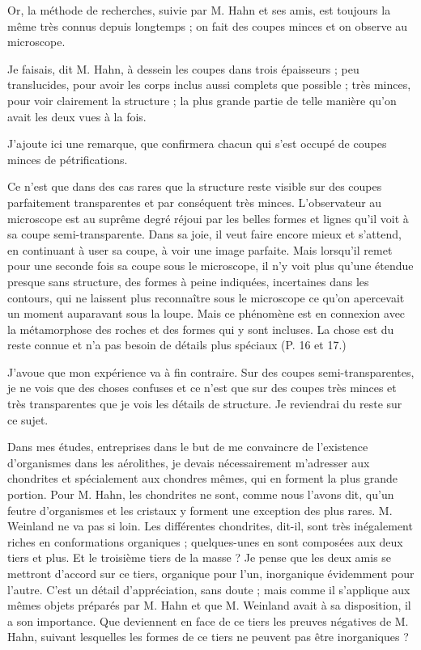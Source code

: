 \documentclass[a4paper, 12pt, oneside, french]{book}
\begin{document}
Or, la méthode de recherches, suivie par M. Hahn et ses amis, est toujours la même très connus depuis longtemps ; on fait des coupes minces et on observe au microscope.

\og Je faisais, dit M. Hahn, à dessein les coupes dans trois épaisseurs ; peu translucides, pour avoir les corps inclus aussi complets que possible ; très minces, pour voir clairement la structure ; la plus grande partie de telle manière qu'on avait les deux vues à la fois. \fg

\og J'ajoute ici une remarque, que confirmera chacun qui s'est occupé de coupes minces de pétrifications. \fg

\og Ce n'est que dans des cas rares que la structure reste visible sur des coupes parfaitement transparentes et par conséquent très minces. L'observateur au microscope est au suprême degré réjoui par les belles formes et lignes qu'il voit à sa coupe semi-transparente. Dans sa joie, il veut faire encore mieux et s'attend, en continuant à user sa coupe, à voir une image parfaite. Mais lorsqu'il remet pour une seconde fois sa coupe sous le microscope, il n'y voit plus qu'une étendue presque sans structure, des formes à peine indiquées, incertaines dans les contours, qui ne laissent plus reconnaître sous le microscope ce qu'on apercevait un moment auparavant sous la loupe. Mais ce phénomène est en connexion avec la métamorphose des roches et des formes qui y sont incluses. La chose est du reste connue et n'a pas besoin de détails plus spéciaux \fg (P. 16 et 17.)

J'avoue que mon expérience va à fin contraire. Sur des coupes semi-transparentes, je ne vois que des choses confuses et ce n'est que sur des coupes très minces et très transparentes que je vois les détails de structure. Je reviendrai du reste sur ce sujet.

Dans mes études, entreprises dans le but de me convaincre de l'existence d'organismes dans les aérolithes, je devais nécessairement m'adresser aux chondrites et spécialement aux chondres mêmes, qui en forment la plus grande portion. Pour M. Hahn, les chondrites ne sont, comme nous l'avons dit, qu'un \og feutre d'organismes \fg et les cristaux y forment une exception des plus rares. M. Weinland ne va pas si loin. \og Les différentes chondrites, dit-il, sont très inégalement riches en conformations organiques ; quelques-unes en sont composées aux deux tiers et plus. \fg Et le troisième tiers de la masse ? Je pense que les deux amis se mettront d'accord sur ce tiers, organique pour l'un, inorganique évidemment pour l'autre. C'est un détail d'appréciation, sans doute ; mais comme il s'applique aux mêmes objets préparés par M. Hahn et que M. Weinland avait à sa disposition, il a son importance. Que deviennent en face de ce tiers les preuves négatives de M. Hahn, suivant lesquelles les formes de ce tiers ne peuvent pas être inorganiques ?
\end{document}
